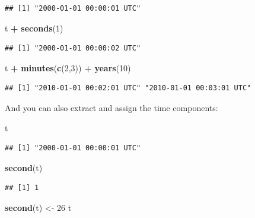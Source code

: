 \documentclass[]{book}
\newenvironment{Shaded}{\begin{snugshade}}{\end{snugshade}}
\newcommand{\DecValTok}[1]{\textcolor[rgb]{0.00,0.00,0.81}{#1}}
\newcommand{\KeywordTok}[1]{\textcolor[rgb]{0.13,0.29,0.53}{\textbf{#1}}}
\newcommand{\NormalTok}[1]{#1}
\newcommand{\OperatorTok}[1]{\textcolor[rgb]{0.81,0.36,0.00}{\textbf{#1}}}
\newcommand{\StringTok}[1]{\textcolor[rgb]{0.31,0.60,0.02}{#1}}
\theoremstyle{definition}
\theoremstyle{definition}
\theoremstyle{definition}
\theoremstyle{remark}
\begin{document}
\begin{verbatim}
## [1] "2000-01-01 00:00:01 UTC"
\end{verbatim}

\begin{Shaded}
\begin{Highlighting}[]
\NormalTok{t }\OperatorTok{+}\StringTok{ }\KeywordTok{seconds}\NormalTok{(}\DecValTok{1}\NormalTok{)}
\end{Highlighting}
\end{Shaded}

\begin{verbatim}
## [1] "2000-01-01 00:00:02 UTC"
\end{verbatim}

\begin{Shaded}
\begin{Highlighting}[]
\NormalTok{t }\OperatorTok{+}\StringTok{ }\KeywordTok{minutes}\NormalTok{(}\KeywordTok{c}\NormalTok{(}\DecValTok{2}\NormalTok{,}\DecValTok{3}\NormalTok{)) }\OperatorTok{+}\StringTok{ }\KeywordTok{years}\NormalTok{(}\DecValTok{10}\NormalTok{)}
\end{Highlighting}
\end{Shaded}

\begin{verbatim}
## [1] "2010-01-01 00:02:01 UTC" "2010-01-01 00:03:01 UTC"
\end{verbatim}

And you can also extract and assign the time components:

\begin{Shaded}
\begin{Highlighting}[]
\NormalTok{t}
\end{Highlighting}
\end{Shaded}

\begin{verbatim}
## [1] "2000-01-01 00:00:01 UTC"
\end{verbatim}

\begin{Shaded}
\begin{Highlighting}[]
\KeywordTok{second}\NormalTok{(t)}
\end{Highlighting}
\end{Shaded}

\begin{verbatim}
## [1] 1
\end{verbatim}

\begin{Shaded}
\begin{Highlighting}[]
\KeywordTok{second}\NormalTok{(t) <-}\StringTok{ }\DecValTok{26}
\NormalTok{t}
\end{Highlighting}
\end{Shaded}
\end{document}

